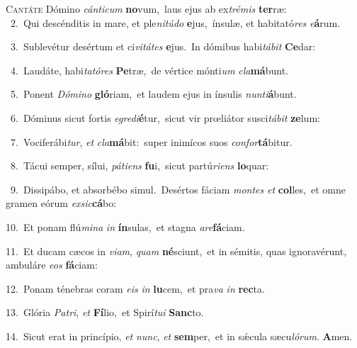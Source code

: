 \lettrine{\initial\textcolor{\initialcolor}{C}}{antáte} Dómino \textit{cán}\-\textit{ti}\textit{cum} \textbf{no}\-vum,~\star laus ejus ab ex\-\textit{tré}\-\textit{mis} \textbf{ter}\-ræ:\\
{\numbfont\textcolor{\numbcolor}{~2.}}~Qui descénditis in mare, et ple\-\textit{ni}\-\textit{tú}\textit{do} \textbf{e}\-jus,~\star ínsulæ, et habitató\textit{res} \textit{e}\-\textbf{á}rum.\par
{\numbfont\textcolor{\numbcolor}{~3.}}~Sublevétur desértum et ci\-\textit{vi}\-\textit{tá}\textit{tes} \textbf{e}\-jus.~\star In dómibus habi\-\textit{tá}\-\textit{bit} \textbf{Ce}\-dar:\par
{\numbfont\textcolor{\numbcolor}{~4.}}~Laudáte, habi\-\textit{ta}\-\textit{tó}\textit{res} \textbf{Pe}\-træ,~\star de vértice mónti\textit{um} \textit{cla}\-\textbf{má}bunt.\par
{\numbfont\textcolor{\numbcolor}{~5.}}~Ponent \textit{Dó}\-\textit{mi}\textit{no} \textbf{gló}\-riam,~\star et laudem ejus in ínsulis \textit{nun}\-\textit{ti}\textbf{á}bunt.\par
{\numbfont\textcolor{\numbcolor}{~6.}}~Dóminus sicut fortis \textit{e}\-\textit{gre}\textit{di}\textbf{é}tur,~\star sicut vir prœliátor susci\-\textit{tá}\-\textit{bit} \textbf{ze}\-lum:\par
{\numbfont\textcolor{\numbcolor}{~7.}}~Vociferábi\-\textit{tur}\-, \textit{et} \textit{cla}\-\textbf{má}bit:~\star super inimícos suos \textit{con}\-\textit{for}\textbf{tá}bitur.\par
{\numbfont\textcolor{\numbcolor}{~8.}}~Tácui semper, sílui, \textit{pá}\-\textit{ti}\textit{ens} \textbf{fu}\-i,~\star sicut partú\-\textit{ri}\-\textit{ens} \textbf{lo}\-quar:\par
{\numbfont\textcolor{\numbcolor}{~9.}}~Dissipábo, et absorbébo simul.~\dagger Desértos fáciam \textit{mon}\-\textit{tes} \textit{et} \textbf{col}\-les,~\star et omne gramen eórum \textit{ex}\-\textit{sic}\textbf{cá}bo:\par
{\numbfont\textcolor{\numbcolor}{10.}}~Et ponam flú\-\textit{mi}\-\textit{na} \textit{in} \textbf{ín}\-sulas,~\star et stagna \textit{a}\-\textit{re}\textbf{fá}ciam.\par
{\numbfont\textcolor{\numbcolor}{11.}}~Et ducam cæcos in \textit{vi}\-\textit{am}, \textit{quam} \textbf{né}\-sciunt,~\star et in sémitis, quas ignoravérunt, ambuláre \textit{e}\-\textit{os} \textbf{fá}\-ciam:\par
{\numbfont\textcolor{\numbcolor}{12.}}~Ponam ténebras coram \textit{e}\-\textit{is} \textit{in} \textbf{lu}\-cem,~\star et pra\textit{va} \textit{in} \textbf{rec}\-ta.\par
{\numbfont\textcolor{\numbcolor}{13.}}~Glória \textit{Pa}\-\textit{tri}, \textit{et} \textbf{Fí}\-lio,~\star et Spirí\-\textit{tu}\-\textit{i} \textbf{Sanc}\-to.\par
{\numbfont\textcolor{\numbcolor}{14.}}~Sicut erat in princípio, \textit{et} \textit{nunc}\-, \textit{et} \textbf{sem}\-per,~\star et in sǽcula sæcu\-\textit{ló}\-\textit{rum}. \textbf{A}\-men.\par
